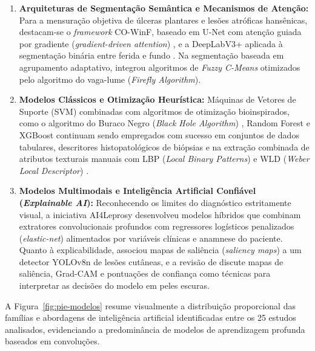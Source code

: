 \begin{enumerate}
    \item \textbf{Arquiteturas de Segmentação Semântica e Mecanismos de Atenção:} Para a mensuração objetiva de úlceras plantares e lesões atróficas hansênicas, destacam-se o \textit{framework} CO-WinF, baseado em U-Net com atenção guiada por gradiente (\textit{gradient-driven attention}) , e a DeepLabV3+ aplicada à segmentação binária entre ferida e fundo . Na segmentação baseada em agrupamento adaptativo,  integrou algoritmos de \textit{Fuzzy C-Means} otimizados pelo algoritmo do vaga-lume (\textit{Firefly Algorithm}).

    \item \textbf{Modelos Clássicos e Otimização Heurística:} Máquinas de Vetores de Suporte (SVM) combinadas com algoritmos de otimização bioinspirados, como o algoritmo do Buraco Negro (\textit{Black Hole Algorithm}) , Random Forest e XGBoost continuam sendo empregados com sucesso em conjuntos de dados tabulares, descritores histopatológicos de biópsias  e na extração combinada de atributos texturais manuais com LBP (\textit{Local Binary Patterns}) e WLD (\textit{Weber Local Descriptor}) .

    \item \textbf{Modelos Multimodais e Inteligência Artificial Confiável (\textit{Explainable AI}):} Reconhecendo os limites do diagnóstico estritamente visual, a iniciativa AI4Leprosy  desenvolveu modelos híbridos que combinam extratores convolucionais profundos com regressores logísticos penalizados (\textit{elastic-net}) alimentados por variáveis clínicas e anamnese do paciente. Quanto à explicabilidade,  associou mapas de saliência (\textit{saliency maps}) a um detector YOLOv8n de lesões cutâneas, e a revisão de  discute mapas de saliência, Grad-CAM e pontuações de confiança como técnicas para interpretar as decisões do modelo em peles escuras.
\end{enumerate}

A Figura~\ref{fig:pie-modelos} resume visualmente a distribuição proporcional das famílias e abordagens de inteligência artificial identificadas entre os 25 estudos analisados, evidenciando a predominância de modelos de aprendizagem profunda baseados em convoluções.

